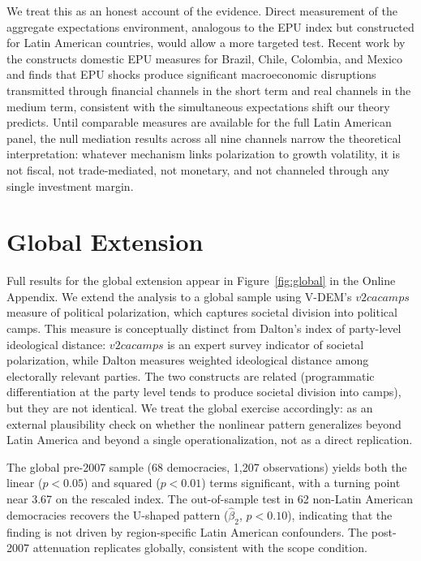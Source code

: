 \documentclass[12pt]{article}
\begin{document}
We treat this as an honest account of the evidence. Direct measurement of
the aggregate expectations environment, analogous to the
\citet{Baker2016} EPU index but constructed for Latin American
countries, would allow a more targeted test. Recent work by the
\citet{BIS2026} constructs domestic EPU measures for Brazil, Chile,
Colombia, and Mexico and finds that EPU shocks produce significant
macroeconomic disruptions transmitted through financial channels in the
short term and real channels in the medium term, consistent with the
simultaneous expectations shift our theory predicts. Until comparable
measures are available for the full Latin American panel, the null
mediation results across all nine channels narrow the theoretical
interpretation: whatever mechanism links polarization to growth volatility,
it is not fiscal, not trade-mediated, not monetary, and not channeled
through any single investment margin.

\section{Global Extension}

Full results for the global extension appear in Figure~\ref{fig:global} in
the Online Appendix. We extend the analysis to a global sample using V-DEM's $v2cacamps$
measure of political polarization, which captures societal division into
political camps. This measure is conceptually distinct from Dalton's index
of party-level ideological distance: $v2cacamps$ is an expert survey
indicator of societal polarization, while Dalton measures weighted
ideological distance among electorally relevant parties. The two constructs
are related (programmatic differentiation at the party level tends to
produce societal division into camps), but they are not identical. We treat
the global exercise accordingly: as an external plausibility check on
whether the nonlinear pattern generalizes beyond Latin America and beyond
a single operationalization, not as a direct replication.

The global pre-2007 sample (68 democracies, 1,207 observations) yields both
the linear ($p < 0.05$) and squared ($p < 0.01$) terms significant, with a
turning point near 3.67 on the rescaled index. The out-of-sample test in 62
non-Latin American democracies recovers the U-shaped pattern
($\hat{\beta}_2$, $p < 0.10$), indicating that the finding is not driven by
region-specific Latin American confounders. The post-2007 attenuation
replicates globally, consistent with the scope condition.
\end{document}

